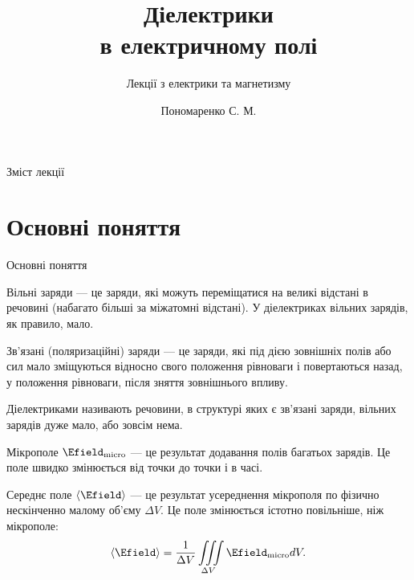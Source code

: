 \documentclass[onlytextwidth]{beamer}
\title[Лекції електрики та магнетизму]{\huge\bfseries Діелектрики \\ в електричному полі}
\subtitle{Лекції з електрики та магнетизму}
\author{Пономаренко С. М.}
\date{}
\begin{document}
\begin{frame}[plain]
	\maketitle
\end{frame}

\begin{frame}{Зміст лекції}{}
	\tableofcontents
\end{frame}

\section{Основні поняття}



\begin{frame}{Основні поняття}{}

	\begin{block}{}\justifying
		\alert{Вільні заряди} --- це заряди, які можуть переміщатися на великі відстані в речовині
		(набагато більші за міжатомні відстані). У діелектриках вільних зарядів, як правило, мало.

		\smallskip

		\alert{Зв'язані (поляризаційні) заряди} --- це заряди, які під дією зовнішніх полів або сил мало
		зміщуються відносно свого положення рівноваги і повертаються назад, у положення рівноваги, після
		зняття
		зовнішнього впливу.

		\smallskip

		\alert{Діелектриками} називають речовини, в структурі яких є зв'язані заряди, вільних зарядів дуже
		мало, або зовсім нема.
	\end{block}
	\begin{block}{}\justifying
		\alert{Мікрополе} $\Efield_\text{micro}$ --- це результат додавання полів багатьох
		зарядів. Це поле
		швидко змінюється від точки до точки і в часі.

		\smallskip

		\alert{Середнє поле} $\left\langle \Efield\right\rangle$  --- це результат усереднення
		мікрополя по
		фізично нескінченно малому об'єму $\Delta V$. Це поле змінюється істотно повільніше, ніж
		мікрополе:
		\begin{equation*}
			\left\langle \Efield\right\rangle = \frac1{\Delta V} \iiint\limits_{\Delta V}
			\Efield_\text{micro} dV.
		\end{equation*}
	\end{block}
\end{frame}
\end{document}
